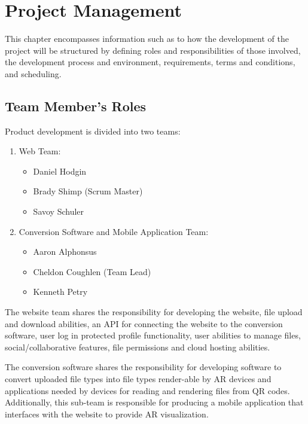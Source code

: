 
\chapter{Project Management}

\hspace{7mm}
This chapter encompasses information such as to how the development of the project will be structured
by defining roles and responsibilities of those involved, the development process and environment,
requirements, terms and conditions, and scheduling.

\section{Team Member's Roles}

Product development is divided into two teams:
\begin{enumerate}
    \item Web Team:
        \begin{itemize}
            \item Daniel Hodgin
            \item Brady Shimp (Scrum Master)
            \item Savoy Schuler
        \end{itemize}
    \item Conversion Software and Mobile Application Team:
        \begin{itemize}
            \item Aaron Alphonsus
            \item Cheldon Coughlen (Team Lead)
            \item Kenneth Petry
        \end{itemize}
\end{enumerate}

The website team shares the responsibility for developing the website, file upload and download abilities, an API for connecting the website to the conversion software, user log in protected profile functionality, user abilities to manage files, social/collaborative features, file permissions and cloud hosting abilities.  


The conversion software shares the responsibility for developing software to convert uploaded file types into file types render-able by AR devices and applications needed by devices for reading and rendering files from QR codes.  Additionally,  this sub-team is responsible for producing a mobile application that interfaces with the website to provide AR visualization.


